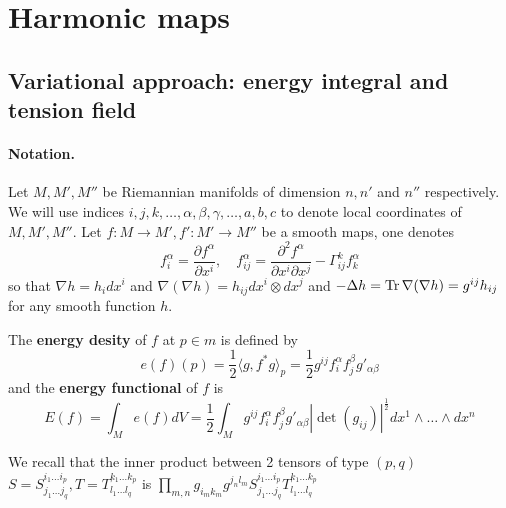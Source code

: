 \section{Harmonic maps}
\label{sec:org6a84b4b}
\subsection{Variational approach: energy integral and tension field}
\label{sec:orgfee7bb0}
\paragraph{Notation.}
\label{sec:orgab3f14a}
Let \(M, M', M''\) be Riemannian manifolds of dimension \(n, n'\) and \(n''\)
respectively. We will use indices \(i,j,k,\dots, \alpha,\beta,\gamma,\dots, a,b,c\) to denote local
coordinates of \(M, M', M''\).
Let \(f: M \longrightarrow M', f': M' \longrightarrow M''\) be a smooth maps, one denotes
\[
f^\alpha_i = \frac{\partial f^\alpha}{\partial x^i},\quad f^\alpha_{ij} =
\frac{\partial^2 f^\alpha}{\partial x^i \partial x^j} - \Gamma_{ij}^k f^{\alpha}_k \]
so that \(\nabla h = h_i dx^i\) and \(\nabla (\nabla h) = h_{ij}dx^i\otimes dx^j\) and
\(-\Delta h = \mathop{\rm Tr}\nolimits \nabla (\nabla h) = g^{ij}h_{ij}\) for any smooth function \(h\).


\begin{definition}
The \textbf{energy desity} of \(f\) at \(p\in m\) is defined by
\[
e(f)(p) = \frac{1}{2}\langle g, f^*g \rangle_p = \frac{1}{2}g^{ij}f^\alpha_i
f^\beta_j g'_{\alpha\beta}
\]
and the \textbf{energy functional} of \(f\) is
\[
E(f) = \int_M e(f) dV = \frac{1}{2}\int_M g^{ij}f^\alpha_i
f^\beta_j g'_{\alpha\beta} |\det (g_{ij})|^\frac{1}{2} dx^1\wedge \dots\wedge dx^n
\]
\end{definition}

We recall that the inner product between 2 tensors of type \((p,q)\) \(S =
S^{i_1\dots i_p}_{j_1\dots j_q}, T = T^{k_1\dots k_p}_{l_1\dots l_q}\) is \(\prod_{m,n}
g_{i_m k_m} g^{j_n l_m}S^{i_1\dots i_p}_{j_1\dots j_q} T^{k_1\dots k_p}_{l_1\dots l_q}\)

